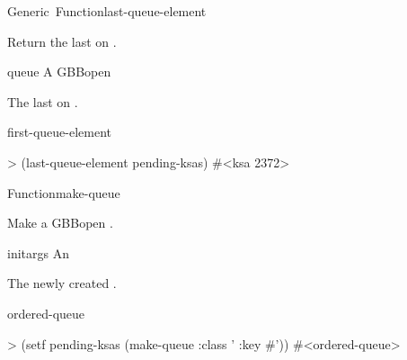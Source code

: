 \documentclass[10pt,twoside,english,pdftex]{article}
\begin{document}
\begin{functiondoc}{Generic~Function}{last-queue-element}{
    \returns{} }
%

\fnsyntax

\fnpurpose Return the last  on .

\fnmethods
{}

\fnpackage {}

\fnmodule {}

\fnargs
\begin{args}{queue}
\arg[queue] A GBBopen 
\end{args}

\fnreturns The last  on .
  
\begin{alsos}{first-queue-element}
\end{alsos}

\fnexample
\begin{example}
> (last-queue-element pending-ksas)
#<ksa 2372>
\end{example}

\end{functiondoc}


\begin{functiondoc}{Function}{make-queue}{ 
    \returns{} }
%
%
%

\fnsyntax

\fnpurpose Make a GBBopen .

\fnpackage {}

\fnmodule {}

\fnargs
\begin{args}{initargs}
\arg[initargs] An 
\end{args}

\fnreturns The newly created .
  
\begin{alsos}{ordered-queue}
\also[queue]
\end{alsos}

\fnexample
{}%
%
\begin{example}
> (setf pending-ksas (make-queue :class '
                                 :key #'))
#<ordered-queue>
\end{example}

\end{functiondoc}
\end{document}
